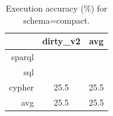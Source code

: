 \begin{table}[htb]
\centering
\caption{Execution accuracy (\%) for schema=compact.}
\label{tab:exec-acc-multirun}
\begin{tabular}{|r|cc|}
\hline
 & dirty_v2 & avg \\ \hline
sparql     &  &  \\
sql        &  &  \\
cypher     & 25.5 & 25.5 \\
avg        & 25.5 & 25.5 \\
\hline
\end{tabular}
\end{table}
